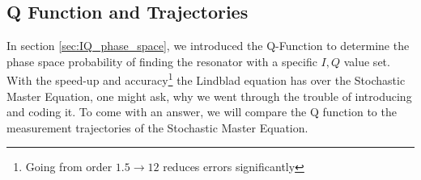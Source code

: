 
\FloatBarrier

\subsection{Q Function and Trajectories}\label{sec:trajectories_and_qfunc}
In section \ref{sec:IQ_phase_space}, we introduced the Q-Function to determine the phase space probability of finding the resonator with a specific $I, Q$ value set. With the speed-up and accuracy\footnote{Going from order $1.5 \rightarrow 12$ reduces errors significantly} the Lindblad equation has over the Stochastic Master Equation, one might ask, why we went through the trouble of introducing and coding it. To come with an answer, we will  compare the Q function to the measurement trajectories of the Stochastic Master Equation.

